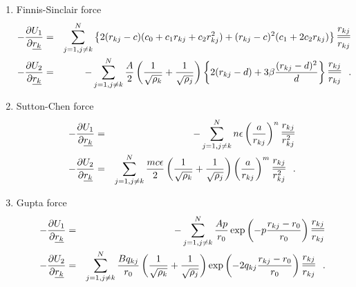 \begin{enumerate}
\item Finnis-Sinclair force
\begin{eqnarray}
-\frac{\partial U_{1}}{\partial \mbox{$\underline{r_{k}}$}} &=& \sum_{j=1,j \ne k}^{N} \left\{
2 (r_{kj}-c) (c_{0}+c_{1}r_{kj}+c_{2}r_{kj}^{2}) +
(r_{kj}-c)^{2} (c_{1}+2c_{2}r_{kj}) \right\} \frac{\mbox{$\underline{r_{kj}}$}}{r_{kj}} \nonumber \\
-\frac{\partial U_{2}}{\partial \mbox{$\underline{r_{k}}$}} &=& -\sum_{j=1,j \ne k}^{N}
{A \over 2} \left( \frac{1}{\sqrt{\rho_{k}}} + \frac{1}{\sqrt{\rho_{j}}} \right) 
\left\{ 2(r_{kj}-d) + 3 \beta \frac{(r_{kj}-d)^{2}}{d} \right\} \frac{\mbox{$\underline{r_{kj}}$}}{r_{kj}}~~.
\end{eqnarray}
\item Sutton-Chen force
\begin{eqnarray}
-\frac{\partial U_{1}}{\partial \mbox{$\underline{r_{k}}$}} &=& -\sum_{j=1,j \ne k}^{N} n \epsilon
\left( \frac{a}{r_{kj}} \right)^{n} \frac{\mbox{$\underline{r_{kj}}$}}{r^{2}_{kj}} \nonumber \\
-\frac{\partial U_{2}}{\partial \mbox{$\underline{r_{k}}$}} &=& \sum_{j=1,j \ne k}^{N} \frac{m c \epsilon}{2}
\left( \frac{1}{\sqrt{\rho_{k}}} + \frac{1}{\sqrt{\rho_{j}}} \right) 
\left( \frac{a}{r_{kj}} \right)^{m} \frac{\mbox{$\underline{r_{kj}}$}}{r^{2}_{kj}}~~.
\end{eqnarray}
\item Gupta force
\begin{eqnarray}
-\frac{\partial U_{1}}{\partial \mbox{$\underline{r_{k}}$}} &=& -\sum_{j=1,j \ne k}^{N} \frac{A p}{r_{0}}
\exp \left( -p \frac{r_{kj}-r_{0}}{r_{0}} \right) \frac{\mbox{$\underline{r_{kj}}$}}{r_{kj}} \nonumber \\
-\frac{\partial U_{2}}{\partial \mbox{$\underline{r_{k}}$}} &=& \sum_{j=1,j \ne k}^{N} \frac{B q_{kj}}{r_{0}}
\left( \frac{1}{\sqrt{\rho_{k}}} + \frac{1}{\sqrt{\rho_{j}}} \right) 
\exp \left( -2 q_{kj} \frac{r_{kj}-r_{0}}{r_{0}} \right) \frac{\mbox{$\underline{r_{kj}}$}}{r_{kj}}~~.
\end{eqnarray}
\end{enumerate}

